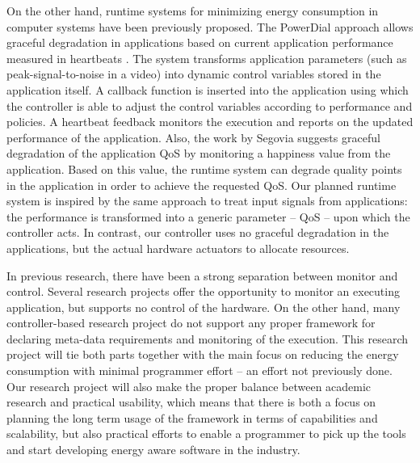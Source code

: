 \documentclass{article}
\begin{document}
On the other hand, runtime systems for minimizing energy consumption in computer systems have been previously proposed.
The PowerDial \cite{Hoffmann:11} approach allows graceful degradation in applications based on current application performance measured in heartbeats \cite{Hoffmann:10}. 
The system transforms application parameters (such as peak-signal-to-noise in a video) into dynamic control variables stored in the application itself. 
A callback function is inserted into the application using which the controller is able to adjust the control variables according to performance and policies.
A heartbeat feedback monitors the execution and reports on the updated performance of the application. 
Also, the work by Segovia \cite{Segovia:11} suggests graceful degradation of the application QoS by monitoring a happiness value from the application. 
Based on this value, the runtime system can degrade quality points in the application in order to achieve the requested QoS. 
Our planned runtime system is inspired by the same approach to treat input signals from applications: the performance is transformed into a generic parameter – QoS – upon which the controller acts.
In contrast, our controller uses no graceful degradation in the applications, but the actual hardware actuators to allocate resources.

In previous research, there have been a strong separation between monitor and control.
Several research projects offer the opportunity to monitor an executing application, but supports no control of the hardware.
On the other hand, many controller-based research project do not support any proper framework for declaring meta-data requirements and monitoring of the execution.
This research project will tie both parts together with the main focus on reducing the energy consumption with minimal programmer effort -- an effort not previously done.
Our research project will also make the proper balance between academic research and practical usability,
which means that there is both a focus on planning the long term usage of the framework in terms of capabilities and scalability, but also practical efforts to enable a programmer to pick up the tools and start developing energy aware software in the industry.
\end{document}
